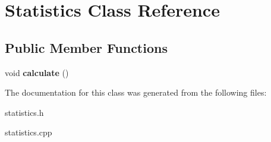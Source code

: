 \hypertarget{class_statistics}{\section{Statistics Class Reference}
\label{class_statistics}
}
\subsection*{Public Member Functions}
\begin{DoxyCompactItemize}
\item 
\hypertarget{class_statistics_a7e997952fa070d42ec4cb97d4a234f87}{void {\bfseries calculate} ()}\label{class_statistics_a7e997952fa070d42ec4cb97d4a234f87}

\end{DoxyCompactItemize}


The documentation for this class was generated from the following files\+:\begin{DoxyCompactItemize}
\item 
statistics.\+h\item 
statistics.\+cpp\end{DoxyCompactItemize}
